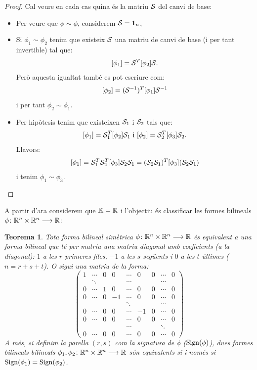 \documentclass[
  11pt,
]{book}
\numberwithin{dummy}{section}
\theoremstyle{maincolornumbox}
\newtheorem{theorem}{TTTT}[chapter]
\newtheorem{theoremeT}{Teorema}[chapter]
\theoremstyle{blacknumex}
\theoremstyle{blacknumbox}
\theoremstyle{maincolornum}
\renewenvironment{theorem}{\begin{tBox}\begin{theoremeT}}{\end{theoremeT}\end{tBox}}
\begin{document}
\begin{proof}

Cal veure en cada cas quina és la matriu \(\mathcal{S}\) del canvi de
base:

\begin{itemize}
\item
  Per veure que \(\phi\sim \phi\), considerem \(\mathcal{S}=\mathbf{1}_n\),
\item
  Si \(\phi_1\sim \phi_2\) tenim que existeix \(\mathcal{S}\) una matriu de
  canvi de base (i per tant invertible) tal que:
  \[[\phi_1]=\mathcal{S}^T [\phi_2] \mathcal{S}.\] Però aquesta igualtat també es
  pot escriure com: \[[\phi_2]=(\mathcal{S}^{-1})^T [\phi_1] \mathcal{S}^{-1}\] i
  per tant \(\phi_2\sim \phi_1\).
\item
  Per hipòtesis tenim que existeixen \(\mathcal{S}_1\) i \(\mathcal{S}_2\) tals que:
  \[[\phi_1]=\mathcal{S}_1^T [\phi_2] \mathcal{S}_1
      \text{ i }
      [\phi_2]=\mathcal{S}_2^T [\phi_3] \mathcal{S}_2.\] Llavors:
  \[[\phi_1]=\mathcal{S}_1^T \mathcal{S}_2^T [\phi_3] \mathcal{S}_2 \mathcal{S}_1=
      (\mathcal{S}_2 \mathcal{S}_1)^T [\phi_3] (\mathcal{S}_2 \mathcal{S}_1)\] i tenim
  \(\phi_1\sim \phi_3\).
\end{itemize}

\end{proof}

A partir d'ara considerem que \(\mathbb{K}=\mathbb{R}\) i l'objectiu és classificar les
formes bilineals \(\phi\colon \mathbb{R}^n\times \mathbb{R}^n \longrightarrow \mathbb{R}\):

\begin{theorem}
\protect\hypertarget{thm:class-formbilR}{}\label{thm:class-formbilR}Tota forma bilineal
simètrica \(\phi\colon \mathbb{R}^n\times \mathbb{R}^n\longrightarrow \mathbb{R}\) és equivalent a una forma
bilineal que té per matriu una matriu diagonal amb coeficients (a la
diagonal): \(1\) a les \(r\) primeres files, \(-1\) a les \(s\) següents i \(0\) a
les \(t\) últimes (\(n=r+s+t\)). O sigui una matriu de la forma:
\[\begin{pmatrix}
1      & \cdots & 0 & 0 & \cdots & 0 & 0 & \cdots & 0 \\
       & \ddots &   &   & \cdots &   &   & \cdots &  \\
0      & \cdots & 1 & 0 & \cdots & 0 & 0 & \cdots & 0 \\
0      & \cdots & 0 & -1 & \cdots & 0 & 0 & \cdots & 0 \\
       &        &   &    & \ddots &   &   & \cdots &   \\
0      & \cdots & 0 &  0 & \cdots & -1 & 0 & \cdots & 0 \\
0      & \cdots & 0 &  0 & \cdots & 0 & 0 & \cdots & 0 \\
       &        &   &    & \cdots &   &   & \ddots &   \\
0      & \cdots & 0 &  0 & \cdots & 0 & 0 & \cdots & 0 
\end{pmatrix}\] A més, si definim la parella \((r,s)\) com la \emph{signatura
de \(\phi\)} (\(\operatorname{Sign}(\phi)\)), dues formes bilineals bilineals
\(\phi_1,\phi_2\colon \mathbb{R}^n\times \mathbb{R}^n\longrightarrow \mathbb{R}\) són equivalents si i només
si \(\operatorname{Sign}(\phi_1)=\operatorname{Sign}(\phi_2)\).
\end{theorem}
\end{document}
